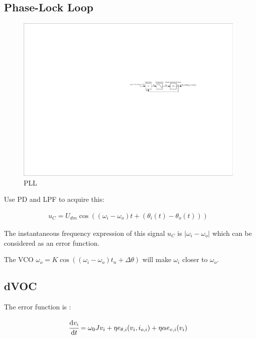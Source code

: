 \subsection*{Phase-Lock Loop}

\begin{figure}[H]
\centering
\includegraphics[width=1\textwidth]{./2023Mar/PLL.pdf}
\caption{PLL}
\label{Report1PLL}
\end{figure}

Use PD and LPF to acquire this:

\begin{equation}
\begin{aligned}
    u_C=U_{dm}\cos{((\omega_i-\omega_o)t+(\theta_i(t)-\theta_o(t)))}
\end{aligned}
\end{equation}

The instantaneous frequency expression of this signal $u_C$ is $|\omega_i-\omega_o|$ which can be considered as an error function.

The VCO $\omega_o=K\cos{((\omega_i-\omega_o)t_n+\Delta\theta)}$ will make $\omega_i$ closer to $\omega_o$.

\subsection*{dVOC}

The error function is :


\begin{equation}
\begin{aligned}
    \cfrac{\mathrm{d} v_i}{\mathrm{d} t}=\omega_0Jv_i+\eta e_{\theta,i}(v_i,i_{o,i})+\eta\alpha e_{v,i}(v_i)
\end{aligned}
\end{equation}

